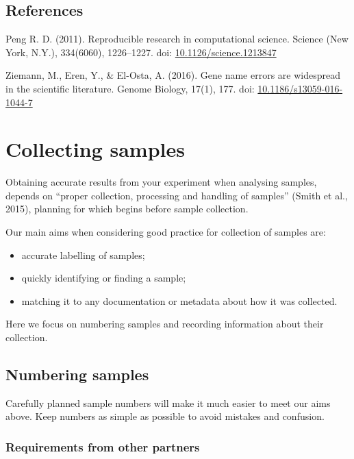 \documentclass[a4paper,oneside]{report}
\providecommand{\tightlist}{%
  \setlength{\itemsep}{0pt}\setlength{\parskip}{0pt}}
\begin{document}
\hypertarget{references-5}{%
\section{References}\label{references-5}}

Peng R. D. (2011). Reproducible research in computational science.
Science (New York, N.Y.), 334(6060), 1226--1227. doi:
\href{https://doi.org/10.1126/science.1213847}{10.1126/science.1213847}

Ziemann, M., Eren, Y., \& El-Osta, A. (2016). Gene name errors are
widespread in the scientific literature. Genome Biology, 17(1), 177.
doi:
\href{https://doi.org/10.1186/s13059-016-1044-7}{10.1186/s13059-016-1044-7}

\hypertarget{collecting-samples}{%
\chapter{Collecting samples}\label{collecting-samples}}

Obtaining accurate results from your experiment when analysing samples,
depends on ``proper collection, processing and handling of samples''
(Smith et al., 2015), planning for which begins before sample
collection.

Our main aims when considering good practice for collection of samples
are:

\begin{itemize}
\tightlist
\item
  accurate labelling of samples;
\item
  quickly identifying or finding a sample;
\item
  matching it to any documentation or metadata about how it was
  collected.
\end{itemize}

Here we focus on numbering samples and recording information about their
collection.

\hypertarget{numbering-samples}{%
\section{Numbering samples}\label{numbering-samples}}

Carefully planned sample numbers will make it much easier to meet our
aims above. Keep numbers as simple as possible to avoid mistakes and
confusion.

\hypertarget{requirements-from-other-partners}{%
\subsection{Requirements from other
partners}\label{requirements-from-other-partners}}
\end{document}
